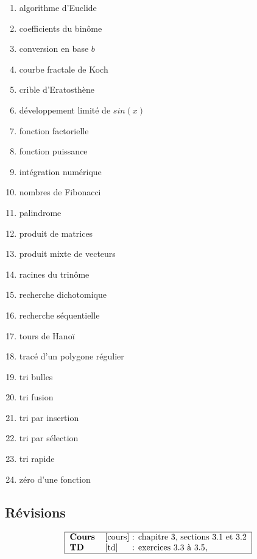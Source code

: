 \noindent\begin{minipage}[t]{7cm}
\begin{enumerate}\setcounter{enumi}{0}
\item algorithme d'Euclide
\item coefficients du binôme
\item conversion en base $b$
\item courbe fractale de Koch
\item crible d'Eratosthène
\item développement limité de $sin(x)$
\item fonction factorielle
\item fonction puissance
\item intégration numérique
\item nombres de Fibonacci
\item palindrome
\item produit de matrices
\end{enumerate}
\end{minipage}
\hfill
\begin{minipage}[t]{7cm}
\begin{enumerate}\setcounter{enumi}{12}
\item produit mixte de vecteurs
\item racines du trinôme
\item recherche dichotomique
\item recherche séquentielle
\item tours de Hanoï
\item tracé d'un polygone régulier
\item tri bulles
\item tri fusion
\item tri par insertion
\item tri par sélection
\item tri rapide
\item zéro d'une fonction
\end{enumerate}
\end{minipage}

\subsection{Révisions}

$$\begin{tabular}{|ll@{ : }l|}
\hline
\textbf{Cours} & \cite{cours} & chapitre 3, sections 3.1 et 3.2 \\
\textbf{TD}    & \cite{td}    & exercices 3.3 à 3.5,  \\
\hline
\end{tabular}$$
